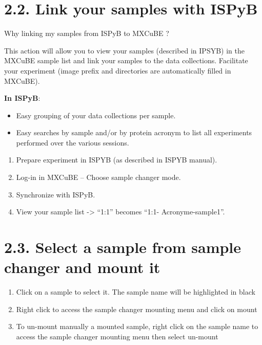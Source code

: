 \documentclass[a4paper,10pt,english]{sphinxmanual}
\begin{document}
\section{2.2. Link your samples with ISPyB}
\label{user_manual:link-your-samples-with-ispyb}
Why linking my samples from ISPyB to MXCuBE ?

This action will allow you to view your samples (described in IPSYB) in the MXCuBE sample list and link your samples to the data collections.
Facilitate your experiment (image prefix and directories are automatically filled in MXCuBE).

\textbf{In ISPyB}:
\begin{itemize}
\item {} 
Easy grouping of your data collections per sample.

\item {} 
Easy searches by sample and/or by protein acronym to list all experiments performed over the various sessions.

\end{itemize}
\begin{enumerate}
\item {} 
Prepare experiment in ISPYB (as described in ISPYB manual).

\item {} 
Log-in in MXCuBE – Choose sample changer mode.

\item {} 
Synchronize with ISPyB.

\item {} 
View your sample list -\textgreater{} “1:1” becomes “1:1- Acronyme-sample1”.

\end{enumerate}


\section{2.3. Select a sample from sample changer and mount it}
\label{user_manual:select-a-sample-from-sample-changer-and-mount-it}\begin{enumerate}
\item {} 
Click on a sample to select it. The sample name will be highlighted in black

\item {} 
Right click to access the sample changer mounting menu and click on mount

\item {} 
To un-mount manually a mounted sample, right click on the sample name to access the sample changer mounting menu then select un-mount

\end{enumerate}
\end{document}
